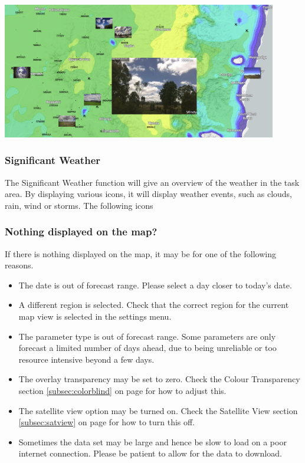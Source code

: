\documentclass[11pt,a4paper]{article}
\begin{document}
\begin{center}
\includegraphics[width=12cm]{images/webcam.png}
\end{center}

\subsubsection{Significant Weather}\label{subsec:sigweather}
The Significant Weather function will give an overview of the weather in the task area. By displaying various icons, it will display weather events, such as clouds, rain, wind or storms. The following icons



\subsubsection{Nothing displayed on the map?}
If there is nothing displayed on the map, it may be for one of the following reasons.
\begin{itemize}
\item The date is out of forecast range. Please select a day closer to today's date.
\item A different region is selected. Check that the correct region for the current map view is selected in the settings menu.
\item The parameter type is out of forecast range. Some parameters are only forecast a limited number of days ahead, due to being unreliable or too resource intensive beyond a few days.
\item The overlay transparency may be set to zero. Check the Colour Transparency section \ref{subsec:colorblind} on page \pageref{subsec:colorblind} for how to adjust this.
\item The satellite view option may be turned on. Check the Satellite View section \ref {subsec:satview} on page \pageref{subsec:satview} for how to turn this off.
\item Sometimes the data set may be large and hence be slow to load on a poor internet connection. Please be patient to allow for the data to download.
\end{itemize}
\end{document}
